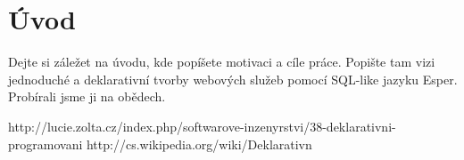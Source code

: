 \chapter*{Úvod}

Dejte si záležet na úvodu, kde popíšete motivaci a cíle práce. Popište tam vizi jednoduché a deklarativní tvorby webových služeb pomocí SQL-like jazyku Esper. Probírali jsme ji na obědech.


http://lucie.zolta.cz/index.php/softwarove-inzenyrstvi/38-deklarativni-programovani
http://cs.wikipedia.org/wiki/Deklarativn%

\emptydoublepage